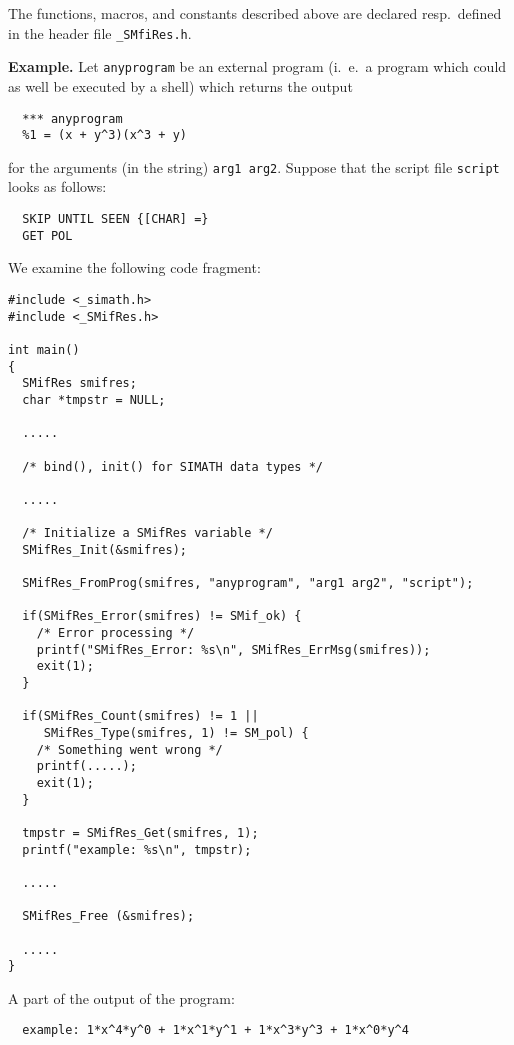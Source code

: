 \documentclass{article}
\begin{document}
The functions, macros, and constants described above are declared
resp.\ defined in the header file \texttt{\_SMfiRes.h}.

\vspace*{12pt} \textbf{Example.} Let \texttt{anyprogram} be an
external program (i.\ e.\ a program which could as well be executed by
a shell) which returns the output

\begin{verbatim}
  *** anyprogram
  %1 = (x + y^3)(x^3 + y)
\end{verbatim}

for the arguments (in the string) \texttt{arg1 arg2}. Suppose that the
script file \texttt{script} looks as follows:

\begin{verbatim}
  SKIP UNTIL SEEN {[CHAR] =}
  GET POL
\end{verbatim}

We examine the following code fragment:

\begin{verbatim}
#include <_simath.h>
#include <_SMifRes.h>

int main() 
{
  SMifRes smifres;
  char *tmpstr = NULL;

  .....

  /* bind(), init() for SIMATH data types */

  .....

  /* Initialize a SMifRes variable */
  SMifRes_Init(&smifres);  
  
  SMifRes_FromProg(smifres, "anyprogram", "arg1 arg2", "script");
  
  if(SMifRes_Error(smifres) != SMif_ok) {
    /* Error processing */
    printf("SMifRes_Error: %s\n", SMifRes_ErrMsg(smifres));
    exit(1);
  }

  if(SMifRes_Count(smifres) != 1 || 
     SMifRes_Type(smifres, 1) != SM_pol) {
    /* Something went wrong */
    printf(.....);
    exit(1);
  }

  tmpstr = SMifRes_Get(smifres, 1);
  printf("example: %s\n", tmpstr);

  .....
  
  SMifRes_Free (&smifres);
 
  .....
}
\end{verbatim}

A part of the output of the program:

\begin{verbatim}
  example: 1*x^4*y^0 + 1*x^1*y^1 + 1*x^3*y^3 + 1*x^0*y^4
\end{verbatim}
\end{document}
